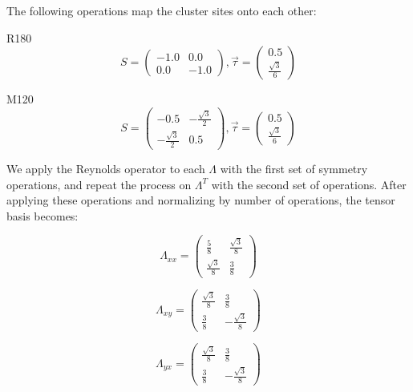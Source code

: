 \documentclass[12pt, fleqn]{article}
\begin{document}
\noindent
The following operations map the cluster sites onto each other:

R180
\begin{equation}
    S=
    \begin{pmatrix}
        -1.0&0.0\\
        0.0&-1.0
    \end{pmatrix}
    ,\vec{\tau}=
    \begin{pmatrix}
        0.5\\
        \frac{\sqrt{3}}{6}
    \end{pmatrix}
    \label{R180}
\end{equation}

M120
\begin{equation}
    S=
    \begin{pmatrix}
        -0.5&-\frac{\sqrt{3}}{2}\\
        -\frac{\sqrt{3}}{2}&0.5
    \end{pmatrix}
    ,\vec{\tau}=
    \begin{pmatrix}
        0.5\\
        \frac{\sqrt{3}}{6}
    \end{pmatrix}
    \label{M120}
\end{equation}

We apply the Reynolds operator to each $\Lambda$ with the first set of symmetry operations,
and repeat the process on $\Lambda^{T}$ with the second set of operations. After applying
these operations and normalizing by number of operations, the tensor basis becomes:

\begin{equation}
    \Lambda_{xx}=
    \begin{pmatrix}
        \frac{5}{8}&\frac{\sqrt{3}}{8}\\
        \frac{\sqrt{3}}{8}&\frac{3}{8}
    \end{pmatrix}
    \label{symbasis}
\end{equation}

\begin{equation}
    \Lambda_{xy}=
    \begin{pmatrix}
        \frac{\sqrt{3}}{8}&\frac{3}{8}\\
        \frac{3}{8}&-\frac{\sqrt{3}}{8}
    \end{pmatrix}
    \label{symbasis}
\end{equation}

\begin{equation}
    \Lambda_{yx}=
    \begin{pmatrix}
        \frac{\sqrt{3}}{8}&\frac{3}{8}\\
        \frac{3}{8}&-\frac{\sqrt{3}}{8}
    \end{pmatrix}
    \label{symbasis}
\end{equation}
\end{document}
